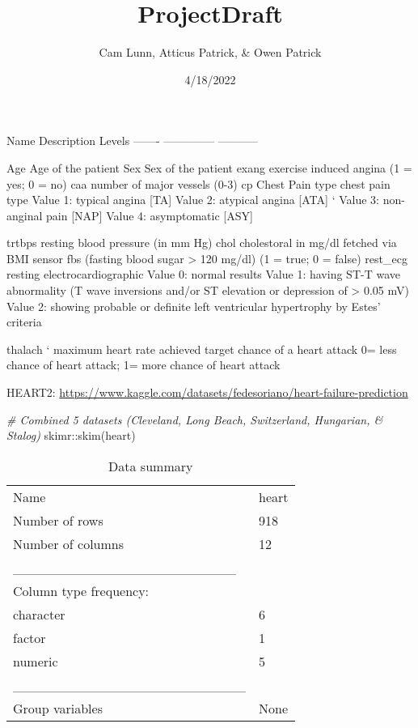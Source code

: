 \documentclass[
]{article}
\title{ProjectDraft}
\author{Cam Lunn, Atticus Patrick, \& Owen Patrick}
\date{4/18/2022}
\newenvironment{Shaded}{\begin{snugshade}}{\end{snugshade}}
\newcommand{\CommentTok}[1]{\textcolor[rgb]{0.56,0.35,0.01}{\textit{#1}}}
\newcommand{\FunctionTok}[1]{\textcolor[rgb]{0.00,0.00,0.00}{#1}}
\newcommand{\NormalTok}[1]{#1}
\newcommand{\SpecialCharTok}[1]{\textcolor[rgb]{0.00,0.00,0.00}{#1}}
\begin{document}
\maketitle

Name Description Levels ------- -------------- -----------

Age Age of the patient Sex Sex of the patient exang exercise induced
angina (1 = yes; 0 = no) caa number of major vessels (0-3) cp Chest Pain
type chest pain type Value 1: typical angina {[}TA{]} Value 2: atypical
angina {[}ATA{]} ` Value 3: non-anginal pain {[}NAP{]} Value 4:
asymptomatic {[}ASY{]}

trtbps resting blood pressure (in mm Hg) chol cholestoral in mg/dl
fetched via BMI sensor fbs (fasting blood sugar \textgreater{} 120
mg/dl) (1 = true; 0 = false) rest\_ecg resting electrocardiographic
Value 0: normal results Value 1: having ST-T wave abnormality (T wave
inversions and/or ST elevation or depression of \textgreater{} 0.05
mV)\\
Value 2: showing probable or definite left ventricular hypertrophy by
Estes' criteria

thalach ` maximum heart rate achieved target chance of a heart attack 0=
less chance of heart attack; 1= more chance of heart attack

HEART2:
\url{https://www.kaggle.com/datasets/fedesoriano/heart-failure-prediction}

\begin{Shaded}
\begin{Highlighting}[]
\CommentTok{\# Combined 5 datasets (Cleveland, Long Beach, Switzerland, Hungarian, \& Stalog)}
\NormalTok{skimr}\SpecialCharTok{::}\FunctionTok{skim}\NormalTok{(heart)}
\end{Highlighting}
\end{Shaded}

\begin{longtable}[]{@{}ll@{}}
\caption{Data summary}\tabularnewline
\toprule
\endhead
Name & heart \\
Number of rows & 918 \\
Number of columns & 12 \\
\_\_\_\_\_\_\_\_\_\_\_\_\_\_\_\_\_\_\_\_\_\_\_ & \\
Column type frequency: & \\
character & 6 \\
factor & 1 \\
numeric & 5 \\
\_\_\_\_\_\_\_\_\_\_\_\_\_\_\_\_\_\_\_\_\_\_\_\_ & \\
Group variables & None \\
\bottomrule
\end{longtable}
\end{document}
